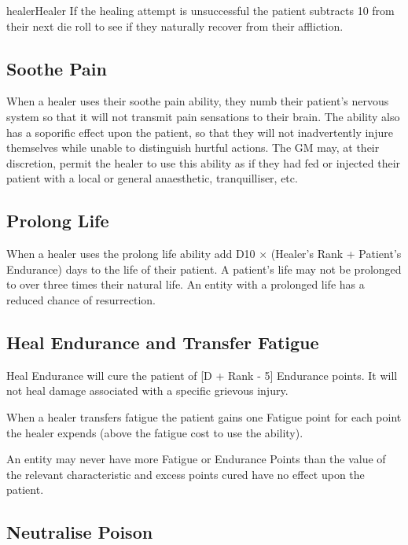 \begin{Skill}[1.4]{healer}{Healer}
If the healing attempt is unsuccessful the patient subtracts 10 from
their next die roll to see if they naturally recover from their
affliction.

\subsection{Soothe Pain}

When a healer uses their soothe pain ability, they numb their
patient’s nervous system so that it will not transmit pain sensations
to their brain.  The ability also has a soporific effect upon the
patient, so that they will not inadvertently injure themselves while
unable to distinguish hurtful actions.  The GM may, at their
discretion, permit the healer to use this ability as if they had fed
or injected their patient with a local or general anaesthetic,
tranquilliser, etc.

\subsection{Prolong Life}

When a healer uses the prolong life ability add D10 × (Healer’s Rank +
Patient’s Endurance) days to the life of their patient. A patient’s
life may not be prolonged to over three times their natural life.  An
entity with a prolonged life has a reduced chance of resurrection.

\subsection{Heal Endurance and Transfer Fatigue}

Heal Endurance will cure the patient of [D + Rank - 5] Endurance
points.  It will not heal damage associated with a specific grievous
injury.

When a healer transfers fatigue the patient gains one Fatigue point
for each point the healer expends (above the fatigue cost to use the
ability).

An entity may never have more Fatigue or Endurance Points than the
value of the relevant characteristic and excess points cured have no
effect upon the patient.

\subsection{Neutralise Poison}


\end{Skill}
